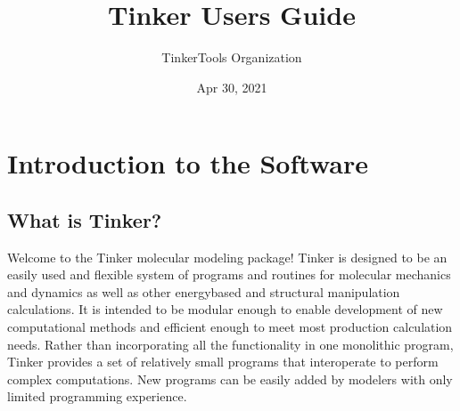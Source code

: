 \documentclass[letterpaper,11pt,english]{sphinxmanual}
\title{Tinker User\textquotesingle{}s Guide}
\date{Apr 30, 2021}
\author{TinkerTools Organization}
\begin{document}
\pagestyle{empty}
\sphinxmaketitle
\pagestyle{plain}
\sphinxtableofcontents
\pagestyle{normal}
\label{\detokenize{index::doc}}



\chapter{Introduction to the Software}
\label{\detokenize{text/introduction:introduction-to-the-software}}\label{\detokenize{text/introduction::doc}}

\section{What is Tinker?}
\label{\detokenize{text/introduction:what-is-tinker}}
Welcome to the Tinker molecular modeling package! Tinker is designed to be an easily used and flexible system of programs and routines for molecular mechanics and dynamics as well as other energy\sphinxhyphen{}based and structural manipulation calculations. It is intended to be modular enough to enable development of new computational methods and efficient enough to meet most production calculation needs. Rather than incorporating all the functionality in one monolithic program, Tinker provides a set of relatively small programs that interoperate to perform complex computations. New programs can be easily added by modelers with only limited programming experience.
\end{document}
